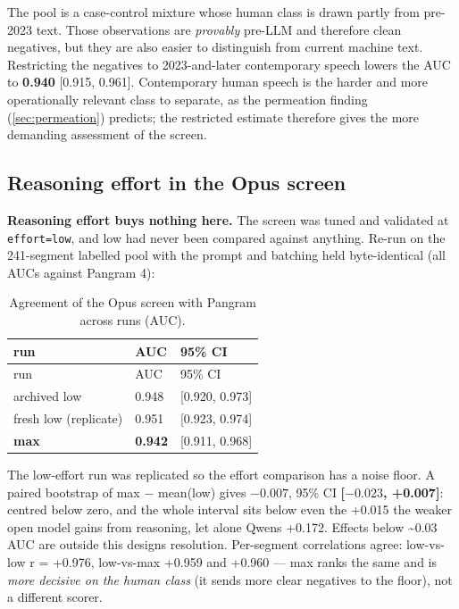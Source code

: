 The pool is a case-control mixture whose human class is drawn partly from
pre-2023 text. Those observations are \emph{provably} pre-LLM and therefore clean
negatives, but they are also easier to distinguish from current machine text.
Restricting the negatives to 2023-and-later contemporary speech lowers the AUC
to \textbf{0.940} {[}0.915, 0.961{]}. Contemporary human speech is the harder and more
operationally relevant class to separate, as the permeation finding (\cref{sec:permeation})
predicts; the restricted estimate therefore gives the more demanding
assessment of the screen.

\subsection{Reasoning effort in the Opus screen}\label{sec:screen-effort}

\textbf{Reasoning effort buys nothing here.} The screen was tuned and validated at
\texttt{effort=low}, and low had never been compared against anything. Re-run on the
241-segment labelled pool with the prompt and batching held byte-identical (all
AUCs against Pangram 4):

\begingroup\small
\begin{longtable}[]{@{}lll@{}}
\caption{Agreement of the Opus screen with Pangram across runs (AUC).}\label{tab:screen-auc}\\
\toprule\noalign{}
run & AUC & 95\% CI \\
\midrule\noalign{}
\endfirsthead
\toprule\noalign{}
run & AUC & 95\% CI \\
\midrule\noalign{}
\endhead
\bottomrule\noalign{}
\endlastfoot
archived low & 0.948 & {[}0.920, 0.973{]} \\
fresh low (replicate) & 0.951 & {[}0.923, 0.974{]} \\
\textbf{max} & \textbf{0.942} & {[}0.911, 0.968{]} \\
\end{longtable}
\endgroup

The low-effort run was replicated so the effort comparison has a noise floor.
A paired bootstrap of max \(-\) mean(low) gives \textbf{\(-0.007\)}, 95\% CI
\textbf{{[}\(-0.023\), +0.007{]}}: centred below zero, and the whole interval sits below
even the +0.015 the weaker open model gains from reasoning, let alone Qwen\textquotesingle s
+0.172. Effects below \textasciitilde0.03 AUC are outside this design\textquotesingle s resolution.
Per-segment correlations agree: low-vs-low r = +0.976, low-vs-max +0.959 and
+0.960 --- max ranks the same and is \emph{more decisive on the human class} (it
sends more clear negatives to the floor), not a different scorer.


